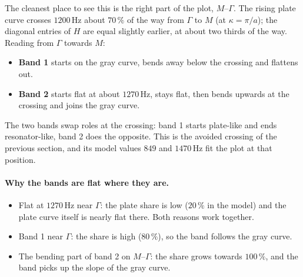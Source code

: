 The cleanest place to see this is the right part of the plot, $M$--$\Gamma$.
The rising plate curve crosses $1200\,\mathrm{Hz}$ about $70\,\%$ of the way
from $\Gamma$ to $M$ (at $\kappa = \pi/a$); the diagonal entries of $H$ are equal
slightly earlier, at about two thirds of the way. Reading from $\Gamma$ towards
$M$:
\begin{itemize}
  \item \textbf{Band 1} starts on the gray curve, bends away below the crossing
        and flattens out.
  \item \textbf{Band 2} starts flat at about $1270\,\mathrm{Hz}$, stays flat,
        then bends upwards at the crossing and joins the gray curve.
\end{itemize}
The two bands swap roles at the crossing: band 1 starts plate-like and ends
resonator-like, band 2 does the opposite. This is the avoided crossing of the
previous section, and its model values $849$ and $1470\,\mathrm{Hz}$ fit the
plot at that position.

\paragraph{Why the bands are flat where they are.}
\begin{itemize}
  \item Flat at $1270\,\mathrm{Hz}$ near $\Gamma$: the plate share is low
        ($20\,\%$ in the model) and the plate curve itself is nearly flat
        there. Both reasons work together.
  \item Band 1 near $\Gamma$: the share is high ($80\,\%$), so the band follows
        the gray curve.
  \item The bending part of band 2 on $M$--$\Gamma$: the share grows towards
        $100\,\%$, and the band picks up the slope of the gray curve.
\end{itemize}

